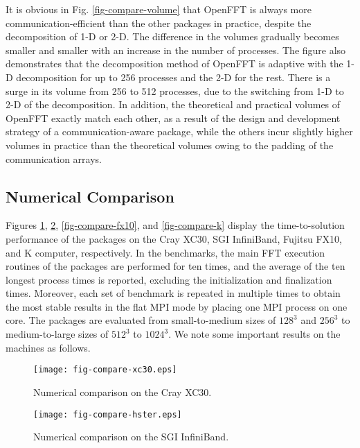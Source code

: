 It is obvious in Fig. \ref{fig-compare-volume} that OpenFFT is always more communication-efficient than the other packages in practice, despite the decomposition of 1-D or 2-D. The difference in the volumes gradually becomes smaller and smaller with an increase in the number of processes. The figure also demonstrates that the decomposition method of OpenFFT is adaptive with the 1-D decomposition for up to 256 processes and the 2-D for the rest. There is a surge in its volume from 256 to 512 processes, due to the switching from 1-D to 2-D of the decomposition. In addition, the theoretical and practical volumes of OpenFFT exactly match each other, as a result of the design and development strategy of a communication-aware package, while the others incur slightly higher volumes in practice than the theoretical volumes owing to the padding of the communication arrays.


\subsection{Numerical Comparison}

Figures \ref{fig-compare-cray}, \ref{fig-compare-hster}, \ref{fig-compare-fx10}, and \ref{fig-compare-k} display the time-to-solution performance of the packages on the Cray XC30, SGI InfiniBand, Fujitsu FX10, and K computer, respectively. In the benchmarks, the main FFT execution routines of the packages are performed for ten times, and the average of the ten longest process times is reported, excluding the initialization and finalization times. Moreover, each set of benchmark is repeated in multiple times to obtain the most stable results in the flat MPI mode by placing one MPI process on one core. The packages are evaluated from small-to-medium sizes of $128^3$ and $256^3$ to medium-to-large sizes of $512^3$ to $1024^3$. 
We note some important results on the machines as follows.

\begin{figure}[htb]
\begin{center}
\texttt{[image: fig-compare-xc30.eps]}
\end{center}
\caption{Numerical comparison on the Cray XC30.}
\label{fig-compare-cray}
\end{figure}

\begin{figure}[htb]
\begin{center}
\texttt{[image: fig-compare-hster.eps]}
\end{center}
\caption{Numerical comparison on the SGI InfiniBand.}
\label{fig-compare-hster}
\end{figure}

